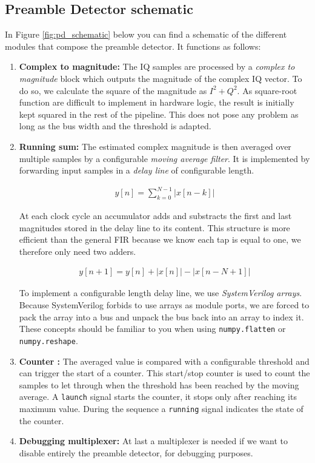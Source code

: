 \subsection{Preamble Detector schematic}
In Figure \ref{fig:pd_schematic} below you can find a schematic of the different modules that compose the preamble detector. It functions as follows:
\begin{enumerate}
    \item \textbf{Complex to magnitude: } The IQ samples are processed by a \textit{complex to magnitude} block which outputs the magnitude of the complex IQ vector.
    To do so, we calculate the square of the magnitude as $I^2+Q^2$. As square-root function are difficult to implement in hardware logic, the result is initially kept squared in the rest of the pipeline. This does not pose any problem as long as the bus width and the threshold is adapted.

    \item \textbf{Running sum: } The estimated complex magnitude is then averaged over multiple samples by a configurable \textit{moving average filter}. It is implemented by forwarding input samples in a \textit{delay line} of configurable length.

    \begin{align}
            y[n] = \sum_{k=0}^{N-1}\left|x[n-k]\right|
    \end{align}

    At each clock cycle an accumulator adds and substracts the first and last magnitudes stored in the delay line to its content. This structure is more efficient than the general FIR because we know each tap is equal to one, we therefore only need two adders.

    \begin{align}
            y[n+1] = y[n] + \left|x[n]\right| - \left|x[n-N+1]\right|
    \end{align}

    To implement a configurable length delay line, we use \textit{SystemVerilog arrays}. Because SystemVerilog forbids to use arrays as module ports, we are forced to pack the array into a bus and unpack the bus back into an array to index it. These concepts should be familiar to you when using \texttt{numpy.flatten} or \texttt{numpy.reshape}.

    \item \textbf{Counter :} The averaged value is compared with a configurable threshold and can trigger the start of a counter. This start/stop counter is used to count the samples to let through when the threshold has been reached by the moving average. A \texttt{launch} signal starts the counter, it stops only after reaching its maximum value. During the sequence a \texttt{running} signal indicates the state of the counter.

    \item \textbf{Debugging multiplexer: }At last a multiplexer is needed if we want to disable entirely the preamble detector, for debugging purposes.

\end{enumerate}



